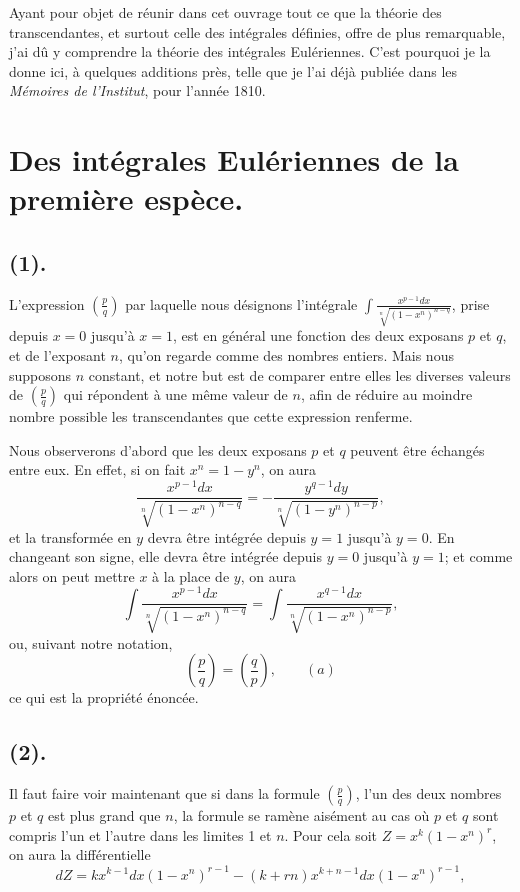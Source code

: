 \documentclass{article}
\begin{document}
Ayant pour objet de réunir dans cet ouvrage tout ce que la théorie des transcendantes, et surtout celle des intégrales définies, offre de plus remarquable, j'ai dû y comprendre la théorie des intégrales Eulériennes. C'est pourquoi je la donne ici, à quelques additions près, telle que je l'ai déjà publiée dans les \emph{Mémoires de l'Institut}, pour l'année 1810.


\section*{Des intégrales Eulériennes de la première espèce.}

\subsection*{(1).}

L'expression $\left(\frac{p}{q}\right)$ par laquelle nous désignons l'intégrale $\displaystyle\int\frac{x^{p-1}dx}{\sqrt[n]{(1-x^{n})^{n-q}}}$, prise depuis $x=0$ jusqu'à $x=1$, est en général une fonction des deux exposans $p$ et $q$, et de l'exposant $n$, qu'on regarde comme des nombres entiers. Mais nous supposons $n$ constant, et notre but est de comparer entre elles les diverses valeurs de $\left(\frac{p}{q}\right)$ qui répondent à une même valeur de $n$, afin de réduire au moindre nombre possible les transcendantes que cette expression renferme.

Nous observerons d'abord que les deux exposans $p$ et $q$ peuvent être échangés entre eux. En effet, si on fait $x^{n}=1-y^{n}$, on aura
\[ \frac{x^{p-1}dx}{\sqrt[n]{(1-x^{n})^{n-q}}}=-\frac{y^{q-1}dy}{\sqrt[n]{(1-y^{n})^{n-p}}}, \]
et la transformée en $y$ devra être intégrée depuis $y=1$ jusqu'à $y=0$. En changeant son signe, elle devra être intégrée depuis $y=0$ jusqu'à $y=1$; et comme alors on peut mettre $x$ à la place de $y$, on aura
\[ \int\frac{x^{p-1}dx}{\sqrt[n]{(1-x^{n})^{n-q}}}=\int\frac{x^{q-1}dx}{\sqrt[n]{(1-x^{n})^{n-p}}}, \]
ou, suivant notre notation,
\[ \left(\frac{p}{q}\right)=\left(\frac{q}{p}\right),\qquad(a) \]
ce qui est la propriété énoncée.

\subsection*{(2).}

Il faut faire voir maintenant que si dans la formule $\left(\frac{p}{q}\right)$, l'un des deux nombres $p$ et $q$ est plus grand que $n$, la formule se ramène aisément au cas où $p$ et $q$ sont compris l'un et l'autre dans les limites 1 et $n$. Pour cela soit $Z=x^{k}(1-x^{n})^{r}$, on aura la différentielle
\[ dZ=kx^{k-1}dx(1-x^{n})^{r-1}-(k+rn)x^{k+n-1}dx(1-x^{n})^{r-1}, \]
\end{document}
